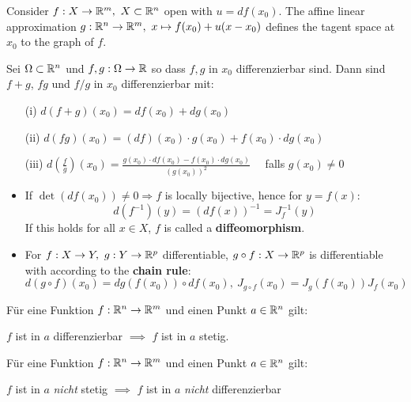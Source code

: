 \begin{definition}
	Consider $f: X \to \mathbb{R}^m, \ X\subset \mathbb{R}^n$ open with $u=df(x_0)$.
	The affine linear approximation $g: \mathbb{R}^n \to \mathbb{R}^m,\  x \mapsto f(x_0) + u(x-x_0)$ defines the tagent space at $x_0$ to the graph of $f$.
\end{definition}

\begin{theorem}[Rechenregeln]
    Sei $\Omega\subset\mathbb{R}^n$ und $f,g:\Omega\to\mathbb{R}$ so dass $f,g$ in $x_0$ differenzierbar sind. Dann sind $f+g$, $f g$ und $f/g$ in $x_0$ differenzierbar mit:
    \begin{itemize}
        \item[(i)] $\displaystyle d(f+g)(x_0) = df(x_0) + dg(x_0)$
        \item[(ii)] $\displaystyle d(fg)(x_0) = (df)(x_0)\cdot g(x_0) + f(x_0)\cdot dg(x_0)$
        \item[(iii)] $\displaystyle d\left(\frac{f}{g}\right)(x_0) = \frac{g(x_0)\cdot df(x_0) - f(x_0)\cdot dg(x_0)}{(g(x_0))^2} \quad$ falls $g(x_0)\neq 0$
        \item If $\det(df(x_0)) \neq 0 \Rightarrow f$ is locally bijective, hence for $y = f(x)$:
			$$d(f^{-1})(y) = (df(x))^{-1} = J^{-1}_f(y)$$
			If this holds for all $x \in X$, $f$ is called a \textbf{diffeomorphism}. 
		\item For $f: X \to Y, \ g: Y \to \mathbb{R}^p$ differentiable, $g\circ f: X \to \mathbb{R}^p$ is differentiable with according to the \textbf{chain rule}:
			$$d(g\circ f)(x_0) = dg(f(x_0))\circ df(x_0), \ J_{g\circ f}(x_0) = J_g(f(x_0))J_f(x_0)$$
    \end{itemize}
\end{theorem}

\begin{theorem}
    Für eine Funktion $f: \mathbb{R}^n \to \mathbb{R}^m$ und einen Punkt $a \in \mathbb{R}^n$ gilt:
    \begin{center}
        $f$ ist in $a$ differenzierbar $\implies$ $f$ ist in $a$ stetig.
    \end{center}
\end{theorem}

\begin{lemma}
    Für eine Funktion $f: \mathbb{R}^n \to \mathbb{R}^m$ und einen Punkt $a \in \mathbb{R}^n$ gilt:
    \begin{center}
        $f$ ist in $a$ \textit{nicht} stetig $\implies$ $f$ ist in $a$ \textit{nicht} differenzierbar
    \end{center}
\end{lemma}

